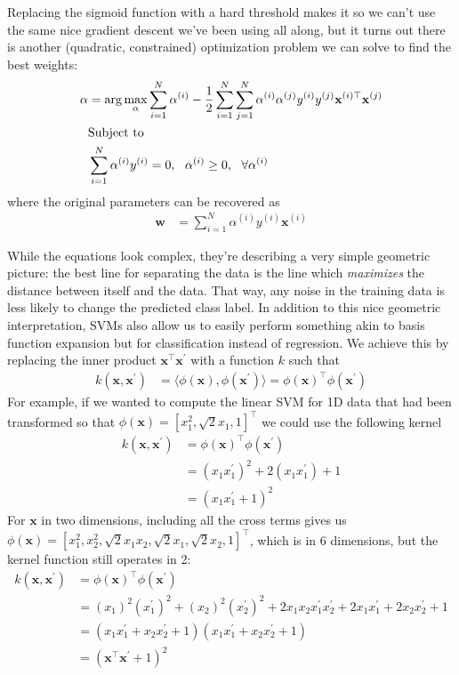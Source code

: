 \documentclass{article}
\begin{document}
Replacing the sigmoid function with a hard threshold makes it so we can't use the same nice gradient descent we've been using all along, but it turns out there is another (quadratic, constrained) optimization problem we can solve to find the best weights:
\begin{align}
	\alpha &= \arg\max_\alpha \sum_{i=1}^N \alpha^{(i)} - \frac{1}{2} \sum_{i=1}^N\sum_{j=1}^N \alpha^{(i)} \alpha^{(j)} y^{(i)} y^{(j)} \mathbf{x}^{(i)\top} \mathbf{x}^{(j)}\\
	&\text{Subject to} \notag\\
	&\sum_{i=1}^N\alpha^{(i)} y^{(i)} = 0, ~~\alpha^{(i)}\geq 0, ~~\forall\alpha^{(i)}\notag
\end{align}
where the original parameters can be recovered as
\begin{align}
	\mathbf{w} &= \sum_{i=1}^{N} \alpha^{(i)} y^{(i)} \mathbf{x}^{(i)}
\end{align}

While the equations look complex, they're describing a very simple geometric picture: the best line for separating the data is the line which \emph{maximizes} the distance between itself and the data. That way, any noise in the training data is less likely to change the predicted class label. In addition to this nice geometric interpretation, SVMs also allow us to easily perform something akin to basis function expansion but for classification instead of regression. We achieve this by replacing the inner product \(\mathbf{x}^\top\mathbf{x}^\prime\) with a function \(k\) such that
\begin{align*}
	k(\mathbf{x},\mathbf{x}^\prime) &= \langle\phi(\mathbf{x}), \phi(\mathbf{x}^\prime)\rangle = \phi(\mathbf{x})^\top \phi(\mathbf{x}^\prime)
\end{align*}
For example, if we wanted to compute the linear SVM for 1D data that had been transformed so that \(\phi(\mathbf{x}) = [x_1^2, \sqrt{2} x_1, 1]^\top\) we could use the following kernel
\begin{align*}
	k(\mathbf{x},\mathbf{x}^\prime) &= \phi(\mathbf{x})^\top\phi(\mathbf{x}^\prime)\\
	&= (x_1 x_1^\prime)^2 + 2(x_1 x_1^\prime) + 1\\
	&= (x_1 x_1^\prime +1)^2
\end{align*}
For \(\mathbf{x}\) in two dimensions, including all the cross terms gives us \(\phi(\mathbf{x}) = [x_1^2, x_2^2, \sqrt{2} x_1 x_2, \sqrt{2} x_1, \sqrt{2} x_2, 1]^\top\), which is in 6 dimensions, but the kernel function still operates in 2:
\begin{align*}
	k(\mathbf{x},\mathbf{x}^\prime) &= \phi(\mathbf{x})^\top\phi(\mathbf{x}^\prime)\\
	&= (x_1)^2 (x_1^\prime)^2 + (x_2)^2(x_2^\prime)^2 + 2 x_1 x_2 x_1^\prime x_2^\prime + 2 x_1 x_1^\prime + 2 x_2 x_2^\prime +1 \\
	&= (x_1 x_1^\prime + x_2 x_2^\prime +1)(x_1 x_1^\prime + x_2 x_2^\prime +1)\\
	&= (\mathbf{x}^\top\mathbf{x}^\prime +1)^2
\end{align*}
\end{document}
